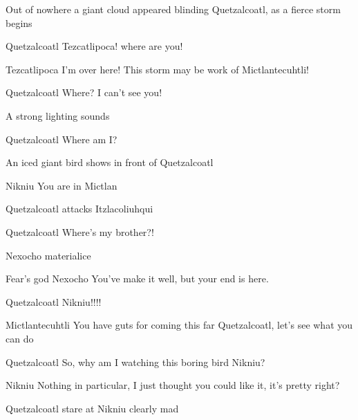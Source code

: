 \documentclass{screenplay}[2012/06/30]
\begin{document}
Out of nowhere a giant cloud appeared blinding Quetzalcoatl, as a fierce storm begins


\begin{dialogue}{Quetzalcoatl}
 Tezcatlipoca! where are you! 
\end{dialogue}


\begin{dialogue}{Tezcatlipoca}
I'm over here! This storm may be work of Mictlantecuhtli! 
\end{dialogue}


\begin{dialogue}{Quetzalcoatl}
 Where? I can't see you! 
\end{dialogue}

A strong lighting sounds 


\begin{dialogue}[confused]{Quetzalcoatl}
Where am I?
\end{dialogue}


An iced giant bird shows in front of Quetzalcoatl


\begin{dialogue}{Nikniu}
You are in Mictlan
\end{dialogue}


Quetzalcoatl attacks Itzlacoliuhqui
\begin{dialogue}{Quetzalcoatl}
Where's my brother?! 
\end{dialogue}



Nexocho materialice 
\begin{dialogue}{Fear's god Nexocho}
You've make it well, but your end is here.
\end{dialogue}

\begin{dialogue}[shouting]{Quetzalcoatl}
Nikniu!!!!
\end{dialogue}

\begin{dialogue}{Mictlantecuhtli}
You have guts for coming this far Quetzalcoatl, let's see what you can do
\end{dialogue}


\begin{dialogue}{Quetzalcoatl}
So, why am I watching this boring bird Nikniu?
\end{dialogue}

\begin{dialogue}[smiling]{Nikniu}
Nothing in particular, I just thought you could like it, it's pretty right?
\end{dialogue}

Quetzalcoatl stare at Nikniu clearly mad
\end{document}

